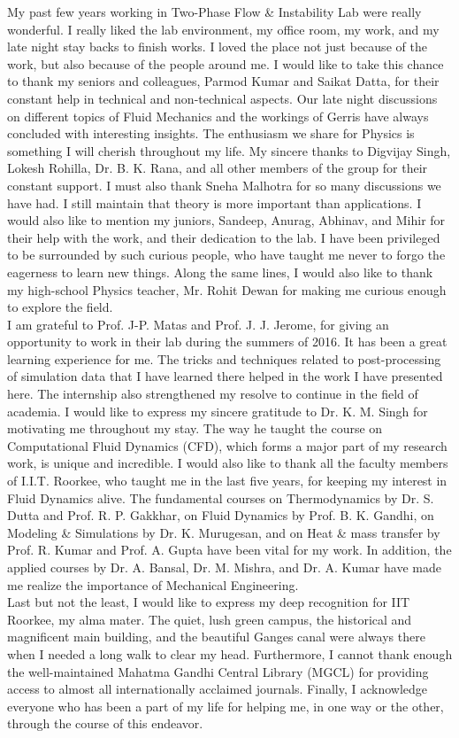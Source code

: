 My past few years working in Two-Phase Flow \& Instability Lab were really wonderful. I really liked the lab environment, my office room, my work, and my late night stay backs to finish works. I loved the place not just because of the work, but also because of the people around me. I would like to take this chance to thank my seniors and colleagues, Parmod Kumar and Saikat Datta, for their constant help in technical and non-technical aspects. Our late night discussions on different topics of Fluid Mechanics and the workings of Gerris have always concluded with interesting insights. The enthusiasm we share for Physics is something I will cherish throughout my life. My sincere thanks to Digvijay Singh, Lokesh Rohilla, Dr. B. K. Rana, and all other members of the group for their constant support. I must also thank Sneha Malhotra for so many discussions we have had. I still maintain that theory is more important than applications. I would also like to mention my juniors, Sandeep, Anurag, Abhinav, and Mihir for their help with the work, and their dedication to the lab. I have been privileged to be surrounded by such curious people, who have taught me never to forgo the eagerness to learn new things. Along the same lines, I would also like to thank my high-school Physics teacher, Mr. Rohit Dewan for making me curious enough to explore the field.\\
I am grateful to Prof. J-P. Matas and Prof. J. J. Jerome, for giving an opportunity to work in their lab during the summers of 2016. It has been a great learning experience for me. The tricks and techniques related to post-processing of simulation data that I have learned there helped in the work I have presented here. The internship also strengthened my resolve to continue in the field of academia. I would like to express my sincere gratitude to Dr. K. M. Singh for motivating me throughout my stay. The way he taught the course on Computational Fluid Dynamics (CFD), which forms a major part of my research work, is unique and incredible. I would also like to thank all the faculty members of I.I.T. Roorkee, who taught me in the last five years, for keeping my interest in Fluid Dynamics alive. The fundamental courses on Thermodynamics by Dr. S. Dutta and Prof. R. P. Gakkhar, on Fluid Dynamics by Prof. B. K. Gandhi, on Modeling \& Simulations by Dr. K. Murugesan, and on Heat \& mass transfer by Prof. R. Kumar and Prof. A. Gupta have been vital for my work. In addition, the applied courses by Dr. A. Bansal, Dr. M. Mishra, and Dr. A. Kumar have made me realize the importance of Mechanical Engineering.\\
Last but not the least, I would like to express my deep recognition for IIT Roorkee, my alma mater. The quiet, lush green campus, the historical and magnificent main building, and the beautiful Ganges canal were always there when I needed a long walk to clear my head. Furthermore, I cannot thank enough the well-maintained Mahatma Gandhi Central Library (MGCL) for providing access to almost all internationally acclaimed journals. Finally, I acknowledge everyone who has been a part of my life for helping me, in one way or the other, through the course of this endeavor.   

